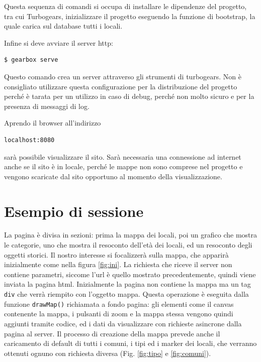 Questa sequenza di comandi si occupa di installare le dipendenze del progetto, tra cui Turbogears, inizializzare il progetto eseguendo la funzione di bootstrap, la quale carica sul database tutti i locali.

Infine si deve avviare il server http:
\begin{lstlisting}[language=c]
$ gearbox serve
\end{lstlisting} 

Questo comando crea un server attraverso gli strumenti di turbogears.
Non è consigliato utilizzare questa configurazione per la distribuzione del progetto perché è tarata per un utilizzo in caso di debug, perché non molto sicuro e per la presenza di messaggi di log.

Aprendo il browser all'indirizzo
\begin{lstlisting}
localhost:8080
\end{lstlisting} sarà possibile visualizzare il sito. Sarà necessaria una connessione ad internet anche se il sito è in locale, perché le mappe non sono comprese nel progetto e vengono scaricate dal sito opportuno al momento della visualizzazione.

\section{Esempio di sessione}
La pagina è divisa in sezioni: prima la mappa dei locali, poi un grafico che mostra le categorie, uno che mostra il resoconto dell'età dei locali, ed un resoconto degli oggetti storici. Il nostro interesse si focalizzerà sulla mappa, che apparirà inizialmente come nella figura \ref{fig:ini}.
La richiesta che riceve il server non contiene parametri, siccome l'url è quello mostrato precedentemente, quindi viene inviata la pagina html. Inizialmente la pagina non contiene la mappa ma un tag \texttt{div} che verrà riempito con l'oggetto mappa. Questa operazione è eseguita dalla funzione \texttt{drawMap()} richiamata a fondo pagina: gli elementi come il canvas contenente la mappa, i pulsanti di zoom e la mappa stessa vengono quindi aggiunti tramite codice, ed i dati da visualizzare con richieste asincrone dalla pagina al server. Il processo di creazione della mappa prevede anche il caricamento di default di tutti i comuni, i tipi ed i marker dei locali, che verranno ottenuti ognuno con richiesta diversa (Fig. \ref{fig:tipo} e \ref{fig:comuni}).


